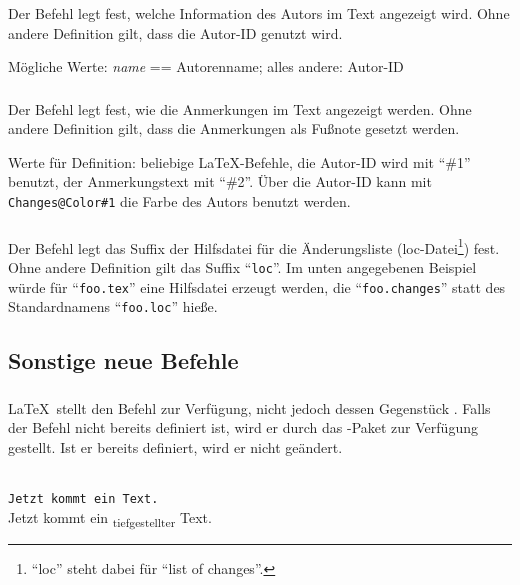 Der Befehl  legt fest, welche Information des Autors im Text angezeigt wird.
Ohne andere Definition gilt, dass die Autor-ID genutzt wird.

Mögliche Werte: \emph{name} == Autorenname; alles andere: Autor-ID




\subsubsection{}
\DescribeMacro{\setremarkmarkup}

Der Befehl  legt fest, wie die Anmerkungen im Text angezeigt werden.
Ohne andere Definition gilt, dass die Anmerkungen als Fußnote gesetzt werden.

Werte für Definition: beliebige \LaTeX-Befehle, die Autor-ID wird mit "`\#1"' benutzt, der Anmerkungstext mit "`\#2"'.
Über die Autor-ID kann mit \texttt{Changes@Color\#1} die Farbe des Autors benutzt werden.




\subsubsection{}
\DescribeMacro{\setlocextension}

Der Befehl  legt das Suffix der Hilfsdatei für die Änderungsliste (loc-Datei\footnote{%
	"`loc"' steht dabei für "`list of changes"'.
}) fest.
Ohne andere Definition gilt das Suffix "`\texttt{loc}"'.
Im unten angegebenen Beispiel würde für "`\texttt{foo.tex}"' eine Hilfsdatei erzeugt werden, die "`\texttt{foo.changes}"' statt des Standardnamens "`\texttt{foo.loc}"' hieße.




\subsection{Sonstige neue Befehle}
\label{sec:user:other}

\subsubsection{}
\DescribeMacro{\textsubscript}

\LaTeX\ stellt den Befehl  zur Verfügung, nicht jedoch dessen Gegenstück .
Falls der Befehl nicht bereits definiert ist, wird er durch das -Paket zur Verfügung gestellt.
Ist er bereits definiert, wird er nicht geändert.
\begin{chusage}
		\>\\
	\usageexample
		\>\texttt{Jetzt kommt ein  Text.}\\
		\>Jetzt kommt ein \textsubscript{tiefgestellter} Text.
\end{chusage}


